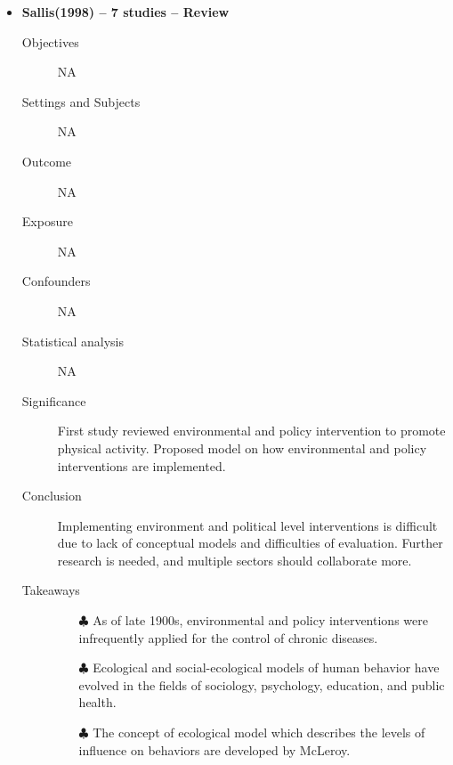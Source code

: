 \documentclass{article}
\begin{document}
\begin{itemize}
\item{\bf Sallis(1998) -- 7 studies  -- Review} 
		\begin{description}
			\item[Objectives] NA 
			\item[Settings and Subjects] NA 
			\item[Outcome] NA 
			\item[Exposure] NA 
			\item[Confounders] NA 
			\item[Statistical analysis] NA 
			\item[Significance] First study reviewed environmental and policy intervention to promote physical activity. Proposed model on how environmental and policy interventions are implemented.  
			\item[Conclusion] Implementing environment and political level interventions is difficult due to lack of conceptual models and difficulties of evaluation. Further research is needed, and multiple sectors should collaborate more. 
			\item[Takeaways] \mbox{}\par
				\begin{itemize}
					\item[$\clubsuit$] As of late 1900s, environmental and policy interventions were infrequently applied for the control of chronic diseases. 
					\item[$\clubsuit$] Ecological and social-ecological models of human behavior have evolved in the fields of sociology, psychology, education, and public health. 
					\item[$\clubsuit$] The concept of ecological model which describes the levels of influence on behaviors are developed by McLeroy. 
				\end{itemize} 
		\end{description}


\end{itemize}
\end{document}

